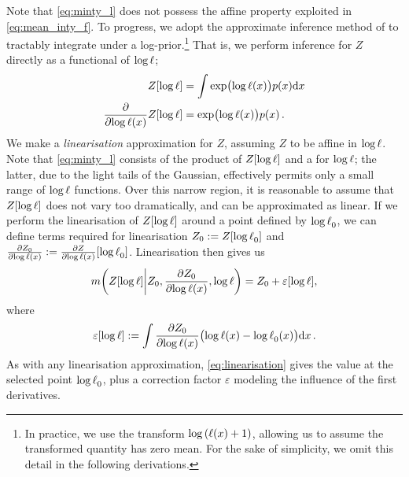 \documentclass{article}
\begin{document}
Note that \eqref{eq:minty_l} does not possess the affine property exploited in \eqref{eq:mean_inty_f}. To progress, we adopt the approximate inference method of \citet{BQR} to tractably integrate under a log-\gpb prior.\footnote{In practice, we use the transform 
$\log\left(\lfn(\lfv) + 1\right)$, allowing us to assume the transformed quantity has zero mean. For the sake of simplicity, we omit this detail in the following derivations.} That is, we perform inference for $Z$ directly as a functional of $\tr$;
%
\begin{align}
 Z[\tr] & = \int \exp \bigl( \tr(\lfv)\bigr) p(\lfv) \ud \lfv\\
\pderiv{}{\tr(\lfv)}Z[\tr] & = \exp \bigl( \tr(\lfv)\bigr) p(\lfv) %
\,.
\end{align}
%
We make a \emph{linearisation} approximation
for $Z$, assuming $Z$ to be affine in $\tr$. 
Note that \eqref{eq:minty_l} consists of the product of $Z[\tr]$ and a \gpb for $\tr$; the latter, due to the light tails of the Gaussian, effectively permits only a small range of $\tr$ functions. Over this narrow region, it is reasonable to assume that $Z[\tr]$ does not vary too dramatically, and can be approximated as linear. If we perform the linearisation of $Z[\tr]$ around a point defined by $\tr_0$, we can define terms required for linearisation
$Z_0 \deq Z[\tr_0]$ and $\pderiv{Z_0}{\tr(\lfv)} \deq \pderiv{Z}{\tr(\lfv)}[\tr_0]$.  Linearisation then gives us
\begin{equation}\label{eq:linearisation}
\novmean{Z[\tr]}{Z_0,\pderiv{Z_0}{\tr(\lfv)}, \tr} 
= Z_0+\varepsilon[\tr],
\end{equation}
where
\begin{equation} \label{eq:correction}
\varepsilon[\tr] \deq \int \pderiv{Z_0}{\tr(\lfv)}\bigl(\tr(\lfv)-\tr_0(\lfv)\bigr)\ud\lfv\,.
\end{equation}
As with any linearisation approximation, \eqref{eq:linearisation} gives the value at the selected point $\tr_0$, plus a correction factor $\varepsilon$ modeling the influence of the first derivatives.
\end{document}

